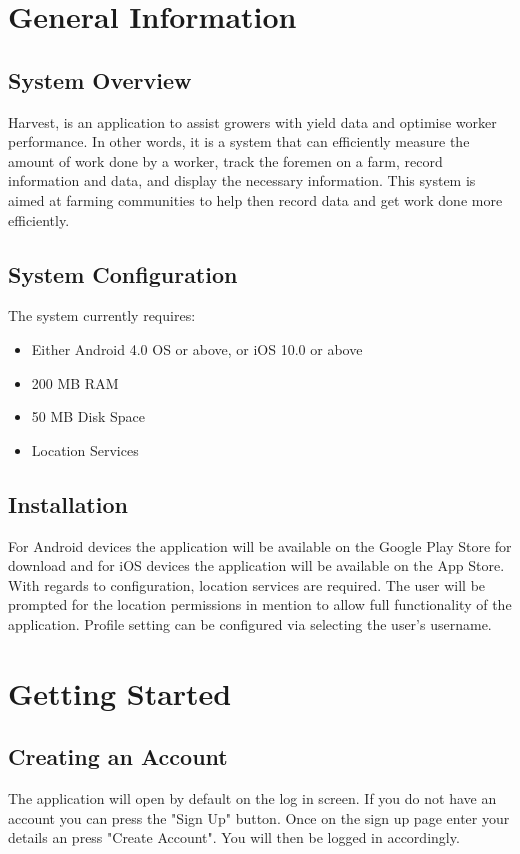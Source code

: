 \documentclass[11pt]{article}
\begin{document}
\newpage
\tableofcontents

\newpage
\section{General Information}
\subsection{System Overview}
Harvest, is an application to assist growers with yield data and optimise worker performance. In other words, it is a system that can efficiently measure the amount of work done by a worker, track the foremen on a farm, record information and data, and display the necessary information. This system is aimed at farming communities to help then record data and get work done more efficiently.\\

\subsection{System Configuration}
The system currently requires:\\
\begin{itemize}
	\item Either Android 4.0 OS or above, or  iOS 10.0 or above
\item 200 MB RAM
\item 50 MB Disk Space	
	\item Location Services
\end{itemize}

\subsection{Installation}
For Android devices the application will be available on the Google Play Store for download and for iOS devices the application will be available on the App Store.\\
With regards to configuration, location services are required. The user will be prompted for the location permissions in mention to allow full functionality of the application. Profile setting can be configured via selecting the user's username.\\

\newpage
\section{Getting Started}

\subsection{Creating an Account}
The application will open by default on the log in screen. If you do not have an account you can press the "Sign Up" button. Once on the sign up page enter your details an press "Create Account". You will then be logged in accordingly.
\end{document}
